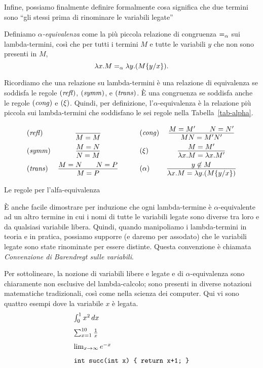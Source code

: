 \documentclass{article}
\begin{document}
Infine, possiamo finalmente definire formalmente cosa significa che due
termini sono ``gli stessi prima di rinominare le variabili legate''

\begin{definition}
  Definiamo {\em $\alpha$-equivalenza} come la pi\`u piccola relazione di congruenza 
  $=_{\alpha}$ sui lambda-termini, cos\`i che per tutti i termini $M$ e tutte le 
  variabili $y$ che non sono presenti in $M$,
  \[ \lambda x.M =_{\alpha} \lambda y.(M\{y/x\}). \]
\end{definition}


Ricordiamo che una relazione su lambda-termini \`e una relazione di equivalenza se
soddisfa le regole $\textrm{(\textit{refl\/})}$, $\textrm{(\textit{symm\/})}$, e
$\textrm{(\textit{trans\/})}$. \`E una congruenza se soddisfa anche le regole
$\textrm{(\textit{cong\/})}$ e $\textrm{(\textit{$\xi$\/})}$.  Quindi, per definizione,
l'$\alpha$-equivalenza \`e la relazione pi\`u piccola sui lambda-termini 
che soddisfano le sei regole nella Tabella~\ref{tab-alpha}.
\begin{table*}[tbp]
\[ \begin{array}{lc}
  \trule{refl} &
  \deriv{}{M=M} \nl
  \trule{symm} &
  \deriv{M=N}{N=M} \nl
  \trule{trans} &
  \deriv{M=N\sep N=P}{M=P}
\end{array} \sep
\begin{array}{lc}
  \trule{cong} &
  \deriv{M=M'\sep N=N'}{MN=M'N'} \nl
  \nrule{\xi} &
  \deriv{M=M'}{\lam x.M=\lam x.M'} \nl
  \nrule{\alpha} &
  \deriv{\mbox{$y\not\in M$}}{\lam x.M = \lam y.(\ren{M}{y}{x})}
\end{array}
\]
\caption{Le regole per l'alfa-equivalenza}
\label{tab-alpha}
\end{table*}

\`E anche facile dimostrare per induzione che ogni lambda-termine \`e
$\alpha$-equivalente ad un altro termine in cui i nomi di tutte le
variabili legate sono diverse tra loro e da qualsiasi variabile libera.
Quindi, quando manipoliamo i lambda-termini in teoria e in pratica,
possiamo supporre (e daremo per assodato) {\wloss} che le variabili legate
sono state rinominate per essere distinte. Questa convenzione \`e chiamata 
{\em Convenzione di Barendregt sulle variabili}.

Per sottolineare, la nozione di variabili libere e legate e di
$\alpha$-equivalenza sono chiaramente non esclusive del lambda-calcolo;
sono presenti in diverse notazioni matematiche tradizionali, cos\`i come
nella scienza dei computer. Qui vi sono quattro esempi dove la variabile $x$
\`e legata.
\[ \begin{array}{l}
  \int_0^1 x^2\,dx \nl
  \sum_{x=1}^{10}\frac{1}{x} \nl
  \lim_{x\to\infty} e^{-x} \nl
  \verb!int succ(int x) { return x+1; }!
\end{array}
\]
\end{document}
